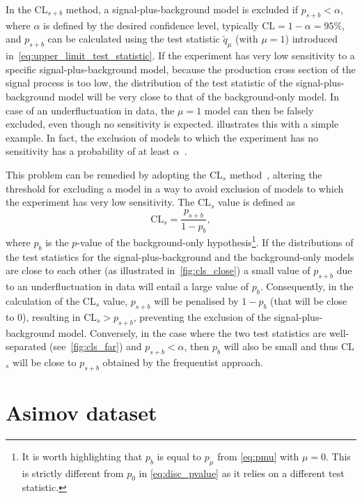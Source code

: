 In the CL$_{s+b}$ method, a signal-plus-background model is excluded if $p_{s+b} < \alpha$, where $\alpha$ is defined by the desired confidence level, typically $\mathrm{CL} = 1 - \alpha = 95\%$, and $p_{s+b}$ can be calculated using the test statistic $\tilde{q}_\mu$ (with $\mu = 1$) introduced in~\cref{eq:upper_limit_test_statistic}. If the experiment has very low sensitivity to a specific signal-plus-background model, \eg because the production cross section of the signal process is too low, the distribution of the test statistic of the signal-plus-background model will be very close to that of the background-only model. In case of an underfluctuation in data, the $\mu = 1$ model can then be falsely excluded, even though no sensitivity is expected.  illustrates this with a simple example. In fact, the exclusion of models to which the experiment has no sensitivity has a probability of at least $\alpha$~\cite{Cowan:2013pha}.

This problem can be remedied by adopting the CL$_s$ method~\cite{Read:2002hq}, altering the threshold for excluding a model in a way to avoid exclusion of models to which the experiment has very low sensitivity. The CL$_s$ value is defined as
\begin{equation}
	\mathrm{CL}_s = \frac{p_{s+b}}{1-p_b},
\end{equation}
where $p_b$ is the $p$-value of the background-only hypothesis\footnote{It is worth highlighting that $p_b$ is equal to $p_\mu$ from \cref{eq:pmu} with $\mu=0$. This is strictly different from $p_0$ in \cref{eq:disc_pvalue} as it relies on a different test statistic.}. If the distributions of the test statistics for the signal-plus-background and the background-only models are close to each other (as illustrated in~\cref{fig:cls_close}) a small value of $p_{s+b}$ due to an underfluctuation in data will entail a large value of $p_b$. Consequently, in the calculation of the CL$_s$ value, $p_{s+b}$ will be penalised by $1-p_b$ (that will be close to 0), resulting in CL$_s > p_{s+b}$, preventing the exclusion of the signal-plus-background model. Conversely, in the case where the two test statistics are well-separated (see~\cref{fig:cls_far}) and $p_{s+b} < \alpha$, then $p_b$ will also be small and thus CL$_s$ will be close to $p_{s+b}$ obtained by the frequentist approach. 

\section{Asimov dataset}


